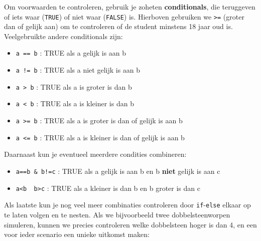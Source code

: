 \documentclass[
  a4paper,
]{scrbook}
\providecommand{\tightlist}{%
  \setlength{\itemsep}{0pt}\setlength{\parskip}{0pt}}\usepackage{longtable,booktabs,array}
\theoremstyle{definition}
\theoremstyle{remark}
\begin{document}
Om voorwaarden te controleren, gebruik je zoheten \textbf{conditionals},
die teruggeven of iets waar (\texttt{TRUE}) of niet waar
(\texttt{FALSE}) is. Hierboven gebruiken we \texttt{\textgreater{}=}
(groter dan of gelijk aan) om te controleren of de student minstens 18
jaar oud is. Veelgebruikte andere conditionals zijn:

\begin{itemize}
\tightlist
\item
  \texttt{a\ ==\ b} : TRUE als a gelijk is aan b
\end{itemize}

\begin{itemize}
\item
  \texttt{a\ !=\ b} : TRUE als a niet gelijk is aan b
\item
  \texttt{a\ \textgreater{}\ b} : TRUE als a is groter is dan b
\item
  \texttt{a\ \textless{}\ b} : TRUE als a is kleiner is dan b
\item
  \texttt{a\ \textgreater{}=\ b} : TRUE als a is groter is dan of gelijk
  is aan b
\item
  \texttt{a\ \textless{}=\ b} : TRUE als a is kleiner is dan of gelijk
  is aan b
\end{itemize}

Daarnaast kun je eventueel meerdere condities combineren:

\begin{itemize}
\item
  \texttt{a==b\ \&\ b!=c} : TRUE als a gelijk is aan b en b
  \textbf{niet} gelijk is aan c
\item
  \texttt{a\textless{}b\ \textbar{}\ b\textgreater{}c} : TRUE als a
  kleiner is dan b en b groter is dan c
\end{itemize}

Als laatste kun je nog veel meer combinaties controleren door
\texttt{if}-\texttt{else} elkaar op te laten volgen en te nesten. Als we
bijvoorbeeld twee dobbelsteenworpen simuleren, kunnen we precies
controleren welke dobbelsteen hoger is dan 4, en een voor ieder scenario
een unieke uitkomst maken:
\end{document}
